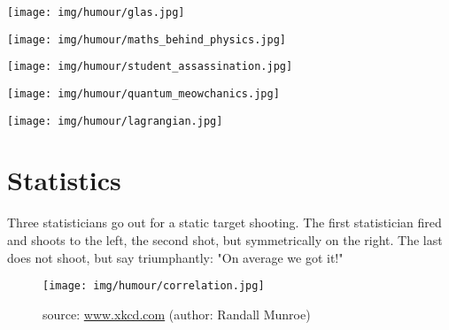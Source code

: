 	\begin{center}\underline{\hspace{5 cm}}\end{center}
	
	\begin{center}
	\texttt{[image: img/humour/glas.jpg]}
	\end{center}
	
	\begin{center}
	\texttt{[image: img/humour/maths\_behind\_physics.jpg]}
	\end{center}
	
	\begin{center}\underline{\hspace{5 cm}}\end{center}
	
	\begin{center}
	\texttt{[image: img/humour/student\_assassination.jpg]}
	\end{center}
	
	\begin{center}
	\texttt{[image: img/humour/quantum\_meowchanics.jpg]}
	\end{center}
	
	\begin{center}
	\texttt{[image: img/humour/lagrangian.jpg]}
	\end{center}

	\pagebreak
	\section{Statistics}
	Three statisticians go out for a static target shooting. The first statistician fired and shoots to the left, the second shot, but symmetrically on the right. The last does not shoot, but say triumphantly: "On average we got it!"

\begin{center}\underline{\hspace{5 cm}}\end{center}

	\begin{figure}[H]
		\centering
		\texttt{[image: img/humour/correlation.jpg]}
		\caption[]{source: \url{www.xkcd.com} (author: Randall Munroe)}
	\end{figure}

\begin{center}\underline{\hspace{5 cm}}\end{center}


